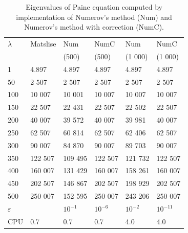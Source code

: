 \documentclass[11pt,a4paper,oneside,openright]{report} %
\begin{document}
\begin{table}[H]
\centering
\caption{Eigenvalues of Paine equation computed by implementation of Numerov's method (Num) and Numerov's method with correction (NumC).}
\label{}
{\small
\begin{tabularx}{\textwidth}{l *{5}{X}}
\toprule
$\lambda$ & Matslise & Num  & NumC & Num & NumC  \\
 &  & (500)  & (500) & (1 000) & (1 000) \\
\midrule
1 & 4.897 & 4.897 & 4.897 & 4.897  & 4.897 \\
50 & 2 507 & 2 507 & 2 507 & 2 507 & 2 507 \\
100 & 10 007 & 10 001 & 10 007 & 10 007 & 10 007 \\
150 & 22 507 & 22 431 & 22 507 & 22 502 & 22 507 \\
200 & 40 007 & 39 572 & 40 007 & 39 981 & 40 007\\
250 & 62 507 & 60 814 & 62 507 & 62 406 & 62 507 \\
300 & 90 007 & 84 870 & 90 007 & 89 703 & 90 007 \\
350 & 122 507 & 109 495 & 122 507 & 121 732 & 122 507 \\
400 & 160 007 & 131 429 & 160 007 & 158 261 & 160 007 \\
450 & 202 507 & 146 867 & 202 507 & 198 929 & 202 507 \\
500 & 250 007 & 152 595 & 250 007 & 243 206 & 250 007 \\
\midrule
$\varepsilon$ &  & $10^{-1}$ & $10^{-6}$ & $10^{-2}$ & $10^{-11}$ \\
CPU & 0.7 & 0.7 & 0.7 & 4.0 & 4.0 \\
\bottomrule
\end{tabularx}
}
\end{table}
\end{document}
